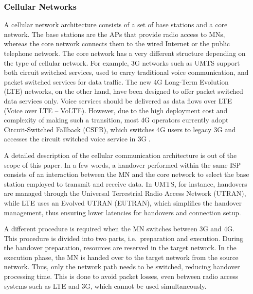 \documentclass[preprint,12pt]{elsarticle}
\begin{document}
\subsubsection{Cellular Networks}
A cellular network architecture consists of a set of base stations and a core network. The base stations are the APs that provide radio access to MNs, whereas the core network connects them to the wired Internet or the public telephone network. The core network has a very different structure depending on the type of cellular network. For example, 3G networks such as UMTS support both circuit switched services, used to carry traditional voice communication, and packet switched services for data traffic. 
The new 4G Long-Term Evolution (LTE) networks, on the other hand, have been designed to offer packet switched data services only. Voice services should be delivered as data flows over LTE (Voice over LTE -- VoLTE). 
However, due to the high deployment cost and complexity of making such a transition, most 4G operators currently adopt Circuit-Switched Fallback (CSFB), which switches 4G users to legacy 3G and accesses the circuit switched voice service in 3G 
\cite{Tu:2014}.

A detailed description of the cellular communication architecture is out of 
the scope of this paper. In a few words, a handover performed within the same 
ISP consists of an interaction between the MN and the 
core network to select the base station employed to transmit and receive data. 
In UMTS, for instance, handovers are managed through the Universal 
Terrestrial Radio Access Network (UTRAN), while LTE uses an Evolved UTRAN 
(EUTRAN), which simplifies the handover management, thus ensuring lower 
latencies for handovers and connection setup.

A different procedure is required when the MN switches between 3G and 4G. 
This procedure is divided into two parts, i.e.~preparation and 
execution. 
During the handover preparation, resources are reserved in the target network.
In the execution phase, the MN is handed over to the target network from the 
source network. Thus, only the network path needs to be switched, reducing 
handover processing time.
This is done to avoid packet losses, even between radio access systems such as 
LTE and 3G, which cannot be used simultaneously.
\end{document}
